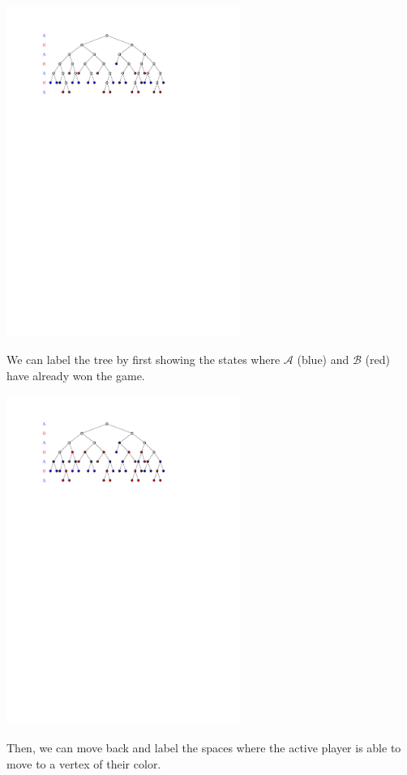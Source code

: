 \documentclass{beamer}
\theoremstyle{theorem}
\theoremstyle{definition}
\newcommand{\<}{\langle}
\renewcommand{\>}{\rangle}
\newcommand{\pl}[1]{\mathscr{#1}}
\begin{document}
\begin{frame}
  \centerline{\includegraphics[width=3in]{decisionTree2.pdf}}

  \vspace{1em}

  We can label the tree by first showing the states where $\pl A$ (blue) and
  $\pl B$ (red) have already won the game.
\end{frame}

\begin{frame}
  \centerline{\includegraphics[width=3in]{decisionTree3.pdf}}

  \vspace{1em}

  Then, we can move back and label the spaces where the active player is able
  to move to a vertex of their color.
\end{frame}
\end{document}
